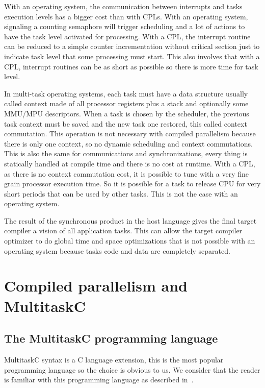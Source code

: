 \documentclass[10pt]{report}
\begin{document}
With an operating system, the communication between interrupts and tasks execution levels has a bigger cost than with CPLs.
With an operating system, signaling a counting semaphore will trigger scheduling and a lot of actions to have the
task level activated for processing. With a CPL, the interrupt routine can be reduced to a simple counter
incrementation without critical section just to indicate task level that some processing must start. This also
involves that with a CPL, interrupt routines can be as short as possible so there is more time for task level.

In multi-task operating systems, each task must have a data structure usually called context made of all processor
registers plus a stack and optionally some MMU/MPU descriptors. When a task is chosen by the scheduler, the previous
task context must be saved and the new task one restored, this called context commutation. This operation is
not necessary with compiled parallelism because there is only one context, so no dynamic scheduling and context
commutations. This is also the same for communications and synchronizations, every thing is statically handled
at compile time and there is no cost at runtime. With a CPL, as there is no context commutation cost, it is
possible to tune with a very fine grain processor execution time. So it is possible for a task to release CPU
for very short periods that can be used by other tasks. This is not the case with an operating system.

The result of the synchronous product in the host language gives the final target compiler a vision of all
application tasks. This can allow the target compiler optimizer to do global time and space optimizations that
is not possible with an operating system because tasks code and data are completely separated.

\chapter{Compiled parallelism and MultitaskC}
\label{sec:cp}

\section{The MultitaskC programming language}

MultitaskC syntax is a C language extension, this is the most popular programming language so the choice is obvious
to us. We consider that the reader is familiar with this programming language as described in~\cite{KR:88}.
\end{document}
